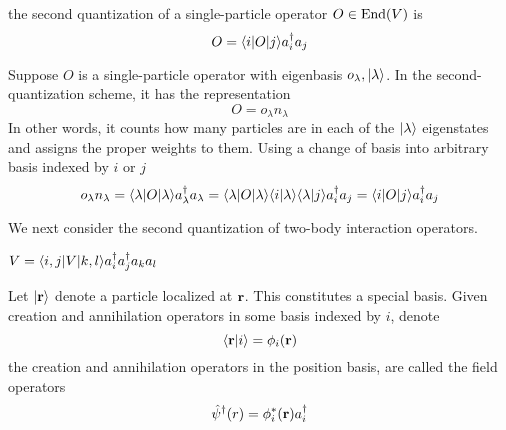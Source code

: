 \begin{proposition} the second quantization of a single-particle operator $O\in \mathrm{End}(V)$ is 
    \[ 
        O = \langle i|O|j\rangle a_i^\dag a_j 
    \] 
    
    \prf 
    Suppose $O$ is a single-particle operator with eigenbasis $o_\lambda, |\lambda\rangle$. 
    In the second-quantization scheme, it has the representation 
    \[ 
        O = o_\lambda n_\lambda 
    \] 
    In other words, it counts how many particles are in each of the $|\lambda\rangle$ eigenstates and 
    assigns the proper weights to them. Using a change of basis into arbitrary basis indexed by $i$ 
    or $j$ 
    \[ 
        o_\lambda n_\lambda 
        = \langle \lambda|O|\lambda\rangle a_\lambda^\dag a_\lambda 
        = \langle \lambda|O|\lambda\rangle \langle i|\lambda\rangle \langle \lambda |j\rangle a_i^\dag a_j \\ 
        = \langle i|O|j\rangle a_i^\dag a_j 
    \] 
\end{proposition}
We next consider the second quantization of two-body interaction operators. 
\begin{proposition}
    $V = \langle i, j|V|k, l\rangle a_i^\dag a_j^\dag a_ka_l$ 
\end{proposition}
\begin{definition}
    Let $|\mathbf r\rangle$ denote a particle localized at $\mathbf r$. This constitutes a special 
    basis. Given creation and annihilation operators in some basis indexed by $i$, denote 
    \[ 
        \langle \mathbf r|i\rangle = \phi_i(\mathbf r)
    \] 
    the creation and annihilation operators in the position basis, are called 
    the field operators 
    \[ 
        \hat \psi^\dag(r) = \phi_i^*(\mathbf r)a_i^\dag 
    \] 
\end{definition}